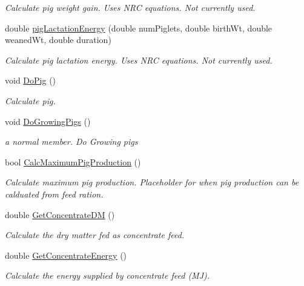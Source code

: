 \begin{DoxyCompactItemize}
\begin{DoxyCompactList}\small\item\em Calculate pig weight gain. Uses N\+RC equations. Not currently used. \end{DoxyCompactList}\item 
double \mbox{\hyperlink{classlivestock_ace8fc768f943e96b99d42783932d53ee}{pig\+Lactation\+Energy}} (double num\+Piglets, double birth\+Wt, double weaned\+Wt, double duration)
\begin{DoxyCompactList}\small\item\em Calculate pig lactation energy. Uses N\+RC equations. Not currently used. \end{DoxyCompactList}\item 
void \mbox{\hyperlink{classlivestock_a4d2339d509e3977e72d2299f6b13a6c1}{Do\+Pig}} ()
\begin{DoxyCompactList}\small\item\em Calculate pig. \end{DoxyCompactList}\item 
void \mbox{\hyperlink{classlivestock_aeff04ec4200c0e18934cf3d0084fb187}{Do\+Growing\+Pigs}} ()
\begin{DoxyCompactList}\small\item\em a normal member. Do Growing pigs \end{DoxyCompactList}\item 
bool \mbox{\hyperlink{classlivestock_a01c291e9fb7f5a9ca29cbadf7bc1be08}{Calc\+Maximum\+Pig\+Production}} ()
\begin{DoxyCompactList}\small\item\em Calculate maximum pig production. Placeholder for when pig production can be calduated from feed ration. \end{DoxyCompactList}\item 
double \mbox{\hyperlink{classlivestock_aae3e79cb0aad2d69a5a1a2a97956f23b}{Get\+Concentrate\+DM}} ()
\begin{DoxyCompactList}\small\item\em Calculate the dry matter fed as concentrate feed. \end{DoxyCompactList}\item 
double \mbox{\hyperlink{classlivestock_aa8d54b87c79101f0633184a7929d5ab9}{Get\+Concentrate\+Energy}} ()
\begin{DoxyCompactList}\small\item\em Calculate the energy supplied by concentrate feed (MJ). \end{DoxyCompactList}\item 

\end{DoxyCompactItemize}
